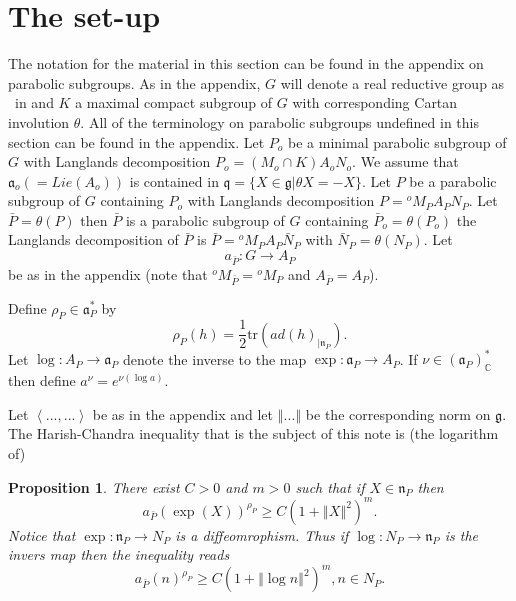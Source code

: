 \documentclass[12pt]{article}%
\newtheorem{proposition}[theorem]{Proposition}
\begin{document}
\section{The set-up}

The notation for the material in this section can be found in the appendix on
parabolic subgroups. As in the appendix, $G$ will denote a real reductive
group as \ in \cite{BoWa} and $K$ a maximal compact subgroup of $G$ with
corresponding Cartan involution $\theta$. All of the terminology on parabolic
subgroups undefined in this section can be found in the appendix. Let $P_{o}$
be a minimal parabolic subgroup of $G$ with Langlands decomposition
$P_{o}=\left(  M_{o}\cap K\right)  A_{o}N_{o}$. We assume that $\mathfrak{a}%
_{o}\left(  =Lie(A_{o})\right)  $ is contained in $\mathfrak{q}=\{X\in
\mathfrak{g}|\theta X=-X\}$. Let $P$ be a parabolic subgroup of $G$ containing
$P_{o}$ with Langlands decomposition $P={}^{o}M_{P}A_{P}N_{P}$. Let $\bar
{P}=\theta(P)$ then $\bar{P}$ is a parabolic subgroup of $G$ containing
$\bar{P}_{o}=\theta(P_{o})$ the Langlands decomposition of $\bar{P}$ is
$\bar{P}={}^{o}M_{P}A_{P}\bar{N}_{P}$ with $\bar{N}_{P}=\theta(N_{P}) $. Let
\[
a_{\bar{P}}:G\rightarrow A_{P}
\]
be as in the appendix (note that ${}^{o}M_{\bar{P}}={}^{o}M_{P}$ and
$A_{\bar{P}}=A_{P}$).

Define $\rho_{P}\in\mathfrak{a}_{P}^{\ast}$ by
\[
\rho_{P}(h)=\frac{1}{2}\mathrm{tr}(ad(h)_{|\mathfrak{n}_{P}}).
\]
Let $\log:A_{P}\rightarrow\mathfrak{a}_{P}$ denote the inverse to the map
$\exp:\mathfrak{a}_{P}\rightarrow A_{P}$. If $\nu\in\left(  \mathfrak{a}%
_{P}\right)  _{\mathbb{C}}^{\ast}$ then define $a^{\nu}=e^{\nu(\log a)}$.

Let $\left\langle ...,...\right\rangle $ be as in the appendix and let
$\left\Vert ...\right\Vert $ be the corresponding norm on $\mathfrak{g}$. The
Harish-Chandra inequality that is the subject of this note is (the logarithm of)

\begin{proposition}
\label{H-C-Inequality}There exist $C>0$ and $m>0$ such that if $X\in
\mathfrak{n}_{P}$ then%
\[
a_{\bar{P}}(\exp(X))^{\rho_{P}}\geq C(1+\left\Vert X\right\Vert ^{2})^{m}.
\]
Notice that $\exp:\mathfrak{n}_{P}\rightarrow N_{P}$ is a diffeomrophism. Thus
if $\log:N_{P}\rightarrow\mathfrak{n}_{P}$ is the invers map then the
inequality reads%
\[
a_{\bar{P}}(n)^{\rho_{P}}\geq C(1+\left\Vert \log n\right\Vert ^{2})^{m},n\in
N_{P}.
\]

\end{proposition}
\end{document}
